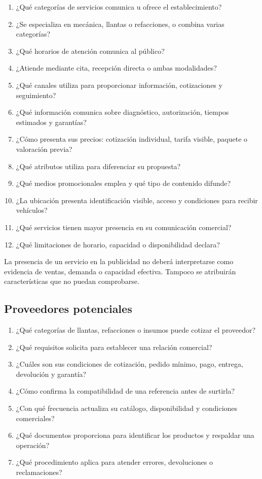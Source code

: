 \documentclass[12pt,letterpaper,oneside]{article}
\begin{document}
\begin{enumerate}
    \item ¿Qué categorías de servicios comunica u ofrece el establecimiento?
    \item ¿Se especializa en mecánica, llantas o refacciones, o combina varias categorías?
    \item ¿Qué horarios de atención comunica al público?
    \item ¿Atiende mediante cita, recepción directa o ambas modalidades?
    \item ¿Qué canales utiliza para proporcionar información, cotizaciones y seguimiento?
    \item ¿Qué información comunica sobre diagnóstico, autorización, tiempos estimados y garantías?
    \item ¿Cómo presenta sus precios: cotización individual, tarifa visible, paquete o valoración previa?
    \item ¿Qué atributos utiliza para diferenciar su propuesta?
    \item ¿Qué medios promocionales emplea y qué tipo de contenido difunde?
    \item ¿La ubicación presenta identificación visible, acceso y condiciones para recibir vehículos?
    \item ¿Qué servicios tienen mayor presencia en su comunicación comercial?
    \item ¿Qué limitaciones de horario, capacidad o disponibilidad declara?
\end{enumerate}

La presencia de un servicio en la publicidad no deberá interpretarse como evidencia de ventas, demanda o capacidad efectiva. Tampoco se atribuirán características que no puedan comprobarse.

\subsection{Proveedores potenciales}

\begin{enumerate}
    \item ¿Qué categorías de llantas, refacciones o insumos puede cotizar el proveedor?
    \item ¿Qué requisitos solicita para establecer una relación comercial?
    \item ¿Cuáles son sus condiciones de cotización, pedido mínimo, pago, entrega, devolución y garantía?
    \item ¿Cómo confirma la compatibilidad de una referencia antes de surtirla?
    \item ¿Con qué frecuencia actualiza su catálogo, disponibilidad y condiciones comerciales?
    \item ¿Qué documentos proporciona para identificar los productos y respaldar una operación?
    \item ¿Qué procedimiento aplica para atender errores, devoluciones o reclamaciones?
\end{enumerate}
\end{document}
